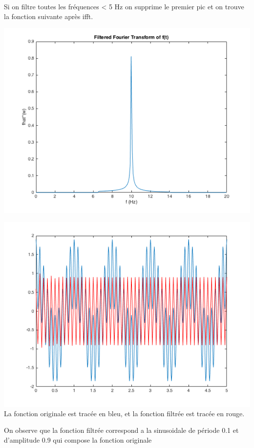 \documentclass[a4paper,11pt]{article}
\begin{document}
Si on filtre toutes les fréquences < 5 Hz on supprime le premier pic et on trouve la fonction suivante après ifft.
\begin{center}
\includegraphics[scale=0.6]{"fhathigh.png"} \newline
\end{center}
\begin{center}
\includegraphics[scale=0.6]{"f_and_fhathigh.png"} \newline
La fonction originale est tracée en bleu, et la fonction filtrée est tracée en rouge.
\end{center}
On observe que la fonction filtrée correspond a la sinusoidale de période 0.1 et d'amplitude 0.9 qui compose la fonction originale \newline
\end{document}
